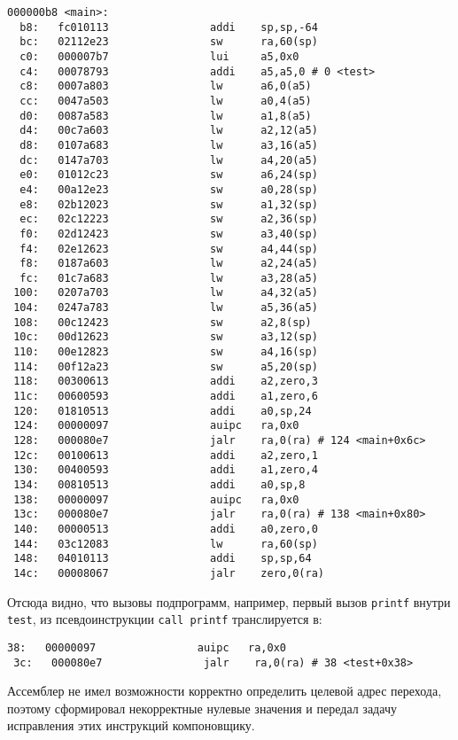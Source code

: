 \begin{Verbatim}[breaklines=true]
000000b8 <main>:
  b8:   fc010113                addi    sp,sp,-64
  bc:   02112e23                sw      ra,60(sp)
  c0:   000007b7                lui     a5,0x0
  c4:   00078793                addi    a5,a5,0 # 0 <test>
  c8:   0007a803                lw      a6,0(a5)
  cc:   0047a503                lw      a0,4(a5)
  d0:   0087a583                lw      a1,8(a5)
  d4:   00c7a603                lw      a2,12(a5)
  d8:   0107a683                lw      a3,16(a5)
  dc:   0147a703                lw      a4,20(a5)
  e0:   01012c23                sw      a6,24(sp)
  e4:   00a12e23                sw      a0,28(sp)
  e8:   02b12023                sw      a1,32(sp)
  ec:   02c12223                sw      a2,36(sp)
  f0:   02d12423                sw      a3,40(sp)
  f4:   02e12623                sw      a4,44(sp)
  f8:   0187a603                lw      a2,24(a5)
  fc:   01c7a683                lw      a3,28(a5)
 100:   0207a703                lw      a4,32(a5)
 104:   0247a783                lw      a5,36(a5)
 108:   00c12423                sw      a2,8(sp)
 10c:   00d12623                sw      a3,12(sp)
 110:   00e12823                sw      a4,16(sp)
 114:   00f12a23                sw      a5,20(sp)
 118:   00300613                addi    a2,zero,3
 11c:   00600593                addi    a1,zero,6
 120:   01810513                addi    a0,sp,24
 124:   00000097                auipc   ra,0x0
 128:   000080e7                jalr    ra,0(ra) # 124 <main+0x6c>
 12c:   00100613                addi    a2,zero,1
 130:   00400593                addi    a1,zero,4
 134:   00810513                addi    a0,sp,8
 138:   00000097                auipc   ra,0x0
 13c:   000080e7                jalr    ra,0(ra) # 138 <main+0x80>
 140:   00000513                addi    a0,zero,0
 144:   03c12083                lw      ra,60(sp)
 148:   04010113                addi    sp,sp,64
 14c:   00008067                jalr    zero,0(ra)
    \end{Verbatim}
    \vspace{2cm}
    Отсюда видно, что вызовы подпрограмм, например, первый вызов \verb|printf| внутри \verb|test|, из псевдоинструкции \verb|call printf| транслируется в:
    \begin{Verbatim}[breaklines=true]
 38:   00000097                auipc   ra,0x0
 3c:   000080e7                jalr    ra,0(ra) # 38 <test+0x38>
    \end{Verbatim}
    Ассемблер не имел возможности корректно определить целевой адрес перехода, поэтому сформировал некорректные нулевые значения и передал задачу исправления этих инструкций компоновщику.

